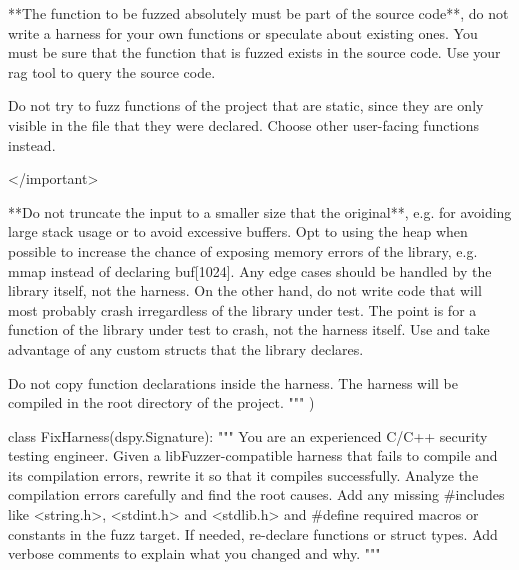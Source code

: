 \documentclass[
  a4paper,
  DIV=11,
  numbers=noendperiod]{scrreprt}
\newenvironment{Shaded}{\begin{snugshade}}{\end{snugshade}}
\newcommand{\CommentTok}[1]{\textcolor[rgb]{0.41,0.41,0.41}{#1}}
\newcommand{\KeywordTok}[1]{\textcolor[rgb]{0.85,0.12,0.09}{#1}}
\newcommand{\NormalTok}[1]{\textcolor[rgb]{0.33,0.33,0.33}{#1}}
\newcommand{\StringTok}[1]{\textcolor[rgb]{0.00,0.50,0.00}{#1}}
\theoremstyle{definition}
\theoremstyle{remark}
\begin{document}
\begin{Shaded}
\begin{Highlighting}[numbers=left,,]
\StringTok{        **The function to be fuzzed absolutely must be part of the source}
\StringTok{        code**, do not write a harness for your own functions or speculate about}
\StringTok{        existing ones. You must be sure that the function that is fuzzed exists}
\StringTok{        in the source code. Use your rag tool to query the source code.}

\StringTok{        Do not try to fuzz functions of the project that are static, since they}
\StringTok{        are only visible in the file that they were declared. Choose other}
\StringTok{        user{-}facing functions instead.}

\StringTok{        \textless{}/important\textgreater{}}

\StringTok{        **Do not truncate the input to a smaller size that the original**,}
\StringTok{        e.g. for avoiding large stack usage or to avoid excessive buffers. Opt}
\StringTok{        to using the heap when possible to increase the chance of exposing}
\StringTok{        memory errors of the library, e.g. mmap instead of declaring}
\StringTok{        buf[1024]. Any edge cases should be handled by the library itself, not}
\StringTok{        the harness. On the other hand, do not write code that will most}
\StringTok{        probably crash irregardless of the library under test. The point is for}
\StringTok{        a function of the library under test to crash, not the harness}
\StringTok{        itself. Use and take advantage of any custom structs that the library}
\StringTok{        declares.}

\StringTok{        Do not copy function declarations inside the harness. The harness will}
\StringTok{        be compiled in the root directory of the project.  """}
\NormalTok{    )}


\KeywordTok{class}\NormalTok{ FixHarness(dspy.Signature):}
    \CommentTok{"""}
\CommentTok{    You are an experienced C/C++ security testing engineer. Given a}
\CommentTok{    libFuzzer{-}compatible harness that fails to compile and its compilation}
\CommentTok{    errors, rewrite it so that it compiles successfully. Analyze the compilation}
\CommentTok{    errors carefully and find the root causes. Add any missing \#includes like}
\CommentTok{    \textless{}string.h\textgreater{}, \textless{}stdint.h\textgreater{} and \textless{}stdlib.h\textgreater{} and \#define required macros or}
\CommentTok{    constants in the fuzz target. If needed, re{-}declare functions or struct}
\CommentTok{    types. Add verbose comments to explain what you changed and why.}
\CommentTok{    """}


\end{Highlighting}
\end{Shaded}
\end{document}
